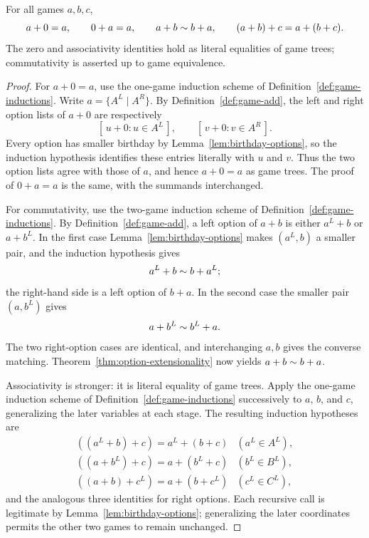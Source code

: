 \begin{theorem}
  \label{thm:game-add-laws}
  \leanok
  For all games \(a,b,c\),
  \[
    a+0=a,\qquad 0+a=a,\qquad a+b\sim b+a,
    \qquad (a+b)+c=a+(b+c).
  \]
  The zero and associativity identities hold as literal equalities of game trees; commutativity
  is asserted up to game equivalence.
\end{theorem}
\begin{proof}
  \leanok
  For \(a+0=a\), use the one-game induction scheme of
  Definition~\ref{def:game-inductions}.  Write \(a=\{A^L\mid A^R\}\).  By
  Definition~\ref{def:game-add}, the left and right option lists of \(a+0\)
  are respectively
  \[
    [\,u+0:u\in A^L\,],
    \qquad
    [\,v+0:v\in A^R\,].
  \]
  Every option has smaller birthday by Lemma~\ref{lem:birthday-options}, so
  the induction hypothesis identifies these entries literally with \(u\) and
  \(v\).  Thus the two option lists agree with those of \(a\), and hence
  \(a+0=a\) as game trees.  The proof of \(0+a=a\) is the same, with the
  summands interchanged.

  For commutativity, use the two-game induction scheme of
  Definition~\ref{def:game-inductions}.  By Definition~\ref{def:game-add}, a
  left option of \(a+b\) is either \(a^L+b\) or \(a+b^L\).  In the first
  case Lemma~\ref{lem:birthday-options} makes \((a^L,b)\) a smaller pair, and
  the induction hypothesis gives
  \[
    a^L+b\sim b+a^L;
  \]
  the right-hand side is a left option of \(b+a\).  In the second case the
  smaller pair \((a,b^L)\) gives
  \[
    a+b^L\sim b^L+a.
  \]
  The two right-option cases are identical, and interchanging \(a,b\) gives
  the converse matching.  Theorem~\ref{thm:option-extensionality} now yields
  \(a+b\sim b+a\).

  Associativity is stronger: it is literal equality of game trees.  Apply the
  one-game induction scheme of Definition~\ref{def:game-inductions}
  successively to \(a\), \(b\), and \(c\), generalizing the later variables at
  each stage.  The resulting induction hypotheses are
  \[
    \begin{array}{ll}
      ((a^L+b)+c)=a^L+(b+c) & (a^L\in A^L),\\
      ((a+b^L)+c)=a+(b^L+c) & (b^L\in B^L),\\
      ((a+b)+c^L)=a+(b+c^L) & (c^L\in C^L),
    \end{array}
  \]
  and the analogous three identities for right options.  Each recursive call
  is legitimate by Lemma~\ref{lem:birthday-options}; generalizing the later
  coordinates permits the other two games to remain unchanged.


\end{proof}
